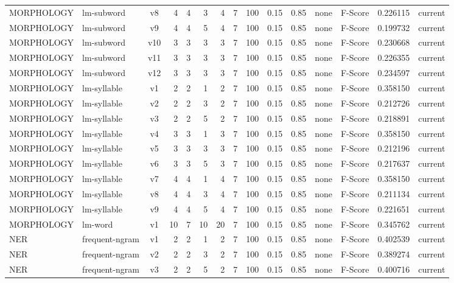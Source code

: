 \documentclass{article}
\begin{document}
\begin{xltabular}{\linewidth}{@{}lYcrrrrrrrrYlrl@{}}
MORPHOLOGY & lm-subword & v8 & 4 & 4 & 3 & 4 & 7 & 100 & 0.15 & 0.85 & none & F-Score & 0.226115 & current \\
MORPHOLOGY & lm-subword & v9 & 4 & 4 & 5 & 4 & 7 & 100 & 0.15 & 0.85 & none & F-Score & 0.199732 & current \\
MORPHOLOGY & lm-subword & v10 & 3 & 3 & 3 & 3 & 7 & 100 & 0.15 & 0.85 & none & F-Score & 0.230668 & current \\
MORPHOLOGY & lm-subword & v11 & 3 & 3 & 3 & 3 & 7 & 100 & 0.15 & 0.85 & none & F-Score & 0.226355 & current \\
MORPHOLOGY & lm-subword & v12 & 3 & 3 & 3 & 3 & 7 & 100 & 0.15 & 0.85 & none & F-Score & 0.234597 & current \\
MORPHOLOGY & lm-syllable & v1 & 2 & 2 & 1 & 2 & 7 & 100 & 0.15 & 0.85 & none & F-Score & 0.358150 & current \\
MORPHOLOGY & lm-syllable & v2 & 2 & 2 & 3 & 2 & 7 & 100 & 0.15 & 0.85 & none & F-Score & 0.212726 & current \\
MORPHOLOGY & lm-syllable & v3 & 2 & 2 & 5 & 2 & 7 & 100 & 0.15 & 0.85 & none & F-Score & 0.218891 & current \\
MORPHOLOGY & lm-syllable & v4 & 3 & 3 & 1 & 3 & 7 & 100 & 0.15 & 0.85 & none & F-Score & 0.358150 & current \\
MORPHOLOGY & lm-syllable & v5 & 3 & 3 & 3 & 3 & 7 & 100 & 0.15 & 0.85 & none & F-Score & 0.212196 & current \\
MORPHOLOGY & lm-syllable & v6 & 3 & 3 & 5 & 3 & 7 & 100 & 0.15 & 0.85 & none & F-Score & 0.217637 & current \\
MORPHOLOGY & lm-syllable & v7 & 4 & 4 & 1 & 4 & 7 & 100 & 0.15 & 0.85 & none & F-Score & 0.358150 & current \\
MORPHOLOGY & lm-syllable & v8 & 4 & 4 & 3 & 4 & 7 & 100 & 0.15 & 0.85 & none & F-Score & 0.211134 & current \\
MORPHOLOGY & lm-syllable & v9 & 4 & 4 & 5 & 4 & 7 & 100 & 0.15 & 0.85 & none & F-Score & 0.221651 & current \\
MORPHOLOGY & lm-word & v1 & 10 & 7 & 10 & 20 & 7 & 100 & 0.15 & 0.85 & none & F-Score & 0.345762 & current \\
NER & frequent-ngram & v1 & 2 & 2 & 1 & 2 & 7 & 100 & 0.15 & 0.85 & none & F-Score & 0.402539 & current \\
NER & frequent-ngram & v2 & 2 & 2 & 3 & 2 & 7 & 100 & 0.15 & 0.85 & none & F-Score & 0.389274 & current \\
NER & frequent-ngram & v3 & 2 & 2 & 5 & 2 & 7 & 100 & 0.15 & 0.85 & none & F-Score & 0.400716 & current \\

\end{xltabular}
\end{document}
